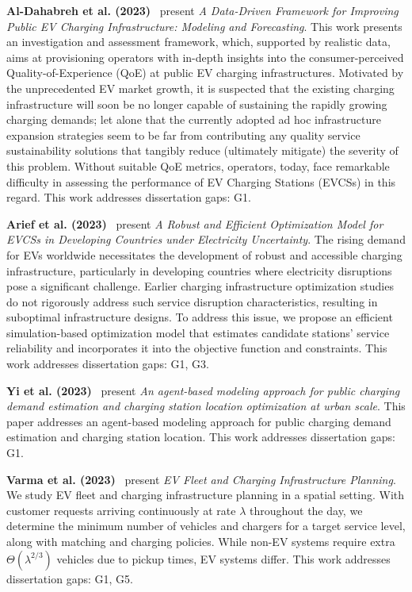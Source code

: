 \documentclass[letterpaper, 12pt, oneside, doublespacing]{Thesis}
\begin{document}
\noindent \textbf{Al-Dahabreh et al. (2023)}~\cite{a_data-driven_2023} present \textit{A Data-Driven Framework for Improving Public EV Charging Infrastructure: Modeling and Forecasting}. This work presents an investigation and assessment framework, which, supported by realistic data, aims at provisioning operators with in-depth insights into the consumer-perceived Quality-of-Experience (QoE) at public EV charging infrastructures. Motivated by the unprecedented EV market growth, it is suspected that the existing charging infrastructure will soon be no longer capable of sustaining the rapidly growing charging demands; let alone that the currently adopted ad hoc infrastructure expansion strategies seem to be far from contributing any quality service sustainability solutions that tangibly reduce (ultimately mitigate) the severity of this problem. Without suitable QoE metrics, operators, today, face remarkable difficulty in assessing the performance of EV Charging Stations (EVCSs) in this regard. This work addresses dissertation gaps: G1.



\noindent \textbf{Arief et al. (2023)}~\cite{a_robust_2023} present \textit{A Robust and Efficient Optimization Model for EVCSs in Developing Countries under Electricity Uncertainty}. The rising demand for EVs worldwide necessitates the development of robust and accessible charging infrastructure, particularly in developing countries where electricity disruptions pose a significant challenge. Earlier charging infrastructure optimization studies do not rigorously address such service disruption characteristics, resulting in suboptimal infrastructure designs. To address this issue, we propose an efficient simulation-based optimization model that estimates candidate stations' service reliability and incorporates it into the objective function and constraints. This work addresses dissertation gaps: G1, G3.



\noindent \textbf{Yi et al. (2023)}~\cite{an_agent-based_2023} present \textit{An agent-based modeling approach for public charging demand estimation and charging station location optimization at urban scale}. This paper addresses an agent-based modeling approach for public charging demand estimation and charging station location. This work addresses dissertation gaps: G1.



\noindent \textbf{Varma et al. (2023)}~\cite{electric_vehicle_2023} present \textit{EV Fleet and Charging Infrastructure Planning}. We study EV fleet and charging infrastructure planning in a spatial setting. With customer requests arriving continuously at rate $\lambda$ throughout the day, we determine the minimum number of vehicles and chargers for a target service level, along with matching and charging policies. While non-EV systems require extra $\Theta(\lambda^{2/3})$ vehicles due to pickup times, EV systems differ. This work addresses dissertation gaps: G1, G5.
\end{document}
